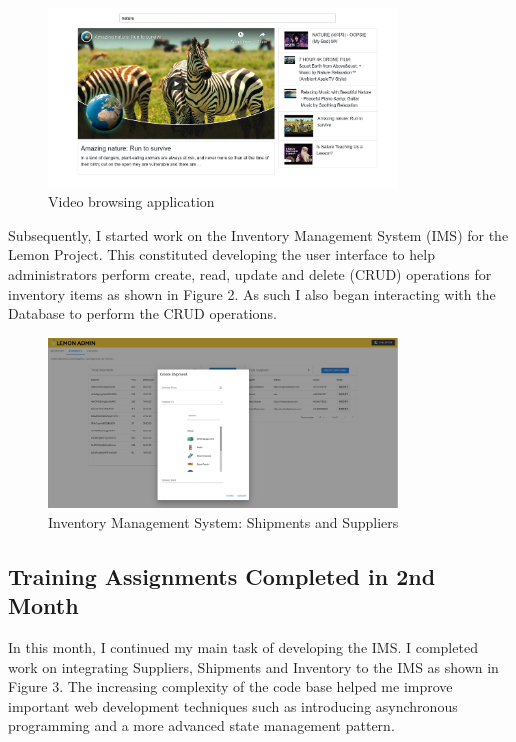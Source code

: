 \begin{figure}[h!]
	\begin{center}
		\includegraphics[width=350px]{assets/images/udemy-project.png}
		\caption{Video browsing application}
		\label{fig:govsg-chatbot}
	\end{center}
\end{figure}

\pagebreak

\noindent
Subsequently, I started work on the Inventory Management System (IMS) for the Lemon Project. This constituted
developing the user interface to help administrators perform create, read, update and delete (CRUD) operations
for inventory items as shown in Figure 2. As such I also began interacting with the Database to perform the CRUD operations.

\begin{figure}[h!]
	\begin{center}
		\includegraphics[width=350px]{assets/images/lemon-shipment.png}
		\caption{Inventory Management System: Shipments and Suppliers}
		\label{fig:lemon-shipment}
	\end{center}
\end{figure}

\subsection{Training Assignments Completed in 2nd Month}
\noindent
In this month, I continued my main task of developing the IMS. I completed work on integrating Suppliers, Shipments and Inventory to the IMS as shown in Figure 3.
The increasing complexity of the code base helped me improve important web development techniques such as introducing asynchronous programming and a more advanced state management pattern.\cite{REF2:1} 

